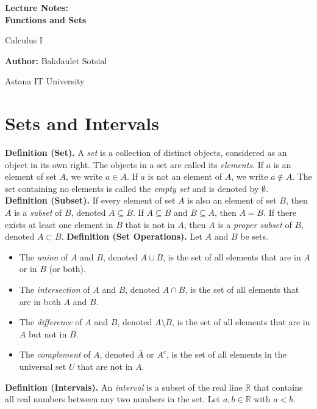 \documentclass[11pt,a4paper]{article}
\begin{document}
\begin{titlepage}
\centering
\vspace*{4cm}
{\Huge\bfseries Lecture Notes:\\ Functions and Sets\par}
\vspace{1cm}
{\Large Calculus I\par}
\vspace{2cm}
{\large \textbf{Author:} Bakdaulet Sotsial\par}
\vspace{1cm}
\vfill
{\small Astana IT University \par}
\vspace*{2cm}
\end{titlepage}
\tableofcontents
\newpage
\section{Sets and Intervals}
\textbf{Definition (Set).} A \textit{set} is a collection of distinct objects, considered as an object in its own right. The objects in a set are called its \textit{elements}. If $a$ is an element of set $A$, we write $a \in A$. If $a$ is not an element of $A$, we write $a \notin A$. The set containing no elements is called the \textit{empty set} and is denoted by $\emptyset$.
\textbf{Definition (Subset).} If every element of set $A$ is also an element of set $B$, then $A$ is a \textit{subset} of $B$, denoted $A \subseteq B$. If $A \subseteq B$ and $B \subseteq A$, then $A = B$. If there exists at least one element in $B$ that is not in $A$, then $A$ is a \textit{proper subset} of $B$, denoted $A \subset B$.
\textbf{Definition (Set Operations).} Let $A$ and $B$ be sets.
\begin{itemize}
\item The \textit{union} of $A$ and $B$, denoted $A \cup B$, is the set of all elements that are in $A$ or in $B$ (or both).
\item The \textit{intersection} of $A$ and $B$, denoted $A \cap B$, is the set of all elements that are in both $A$ and $B$.
\item The \textit{difference} of $A$ and $B$, denoted $A \setminus B$, is the set of all elements that are in $A$ but not in $B$.
\item The \textit{complement} of $A$, denoted $\bar{A}$ or $A^c$, is the set of all elements in the universal set $U$ that are not in $A$.
\end{itemize}
\textbf{Definition (Intervals).} An \textit{interval} is a subset of the real line $\mathbb{R}$ that contains all real numbers between any two numbers in the set. Let $a, b \in \mathbb{R}$ with $a < b$.
\end{document}
